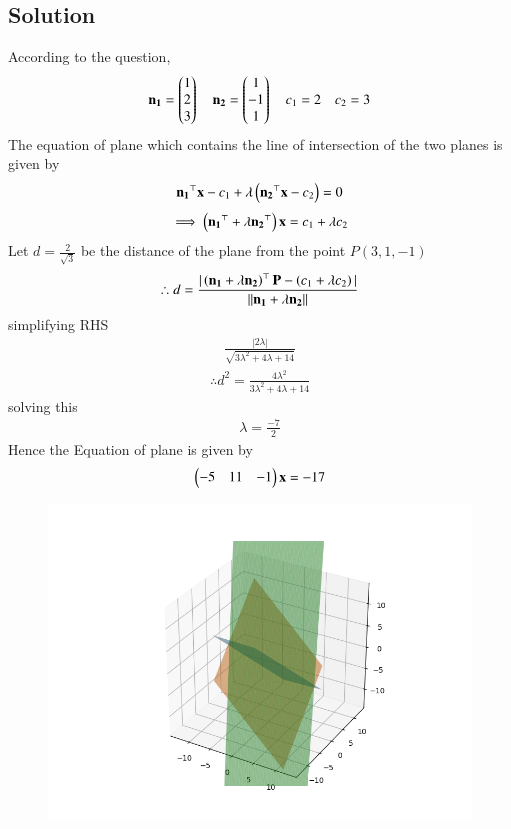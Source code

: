\documentclass[journal]{IEEEtran}
\begin{document}
\subsection*{\textbf{Solution}}
According to the question,\\
\begin{align}
    \mathbf{n_1}=\begin{pmatrix}1\\2\\3\end{pmatrix} \quad \mathbf{n_2}=\begin{pmatrix}1\\-1\\1\end{pmatrix} \quad c_1=2 \quad c_2=3
\end{align}
The equation of plane which contains the line of intersection of the two planes is given by
\begin{align}
    \mathbf{n_1}^{\top}\mathbf{x}-c_1+\lambda\left(\mathbf{n_2}^{\top}\mathbf{x}-c_2\right)=0
\end{align}
\begin{align}
    \implies \left(\mathbf{n_1}^{\top}+\lambda\mathbf{n_2}^{\top}\right)\mathbf{x}=c_1+\lambda c_2
\end{align}
Let $d = \frac{2}{\sqrt{3}}$ be the distance of the plane from the point $P(3,1,-1)$ 
\begin{align}
    \therefore d = \frac{|\left(\mathbf{n_1}+\lambda\mathbf{n_2}\right)^{\top}\mathbf{P} - \left(c_1+\lambda c_2\right)|}{||\mathbf{n_1}+\lambda \mathbf{n_2}||}
\end{align}
simplifying RHS
\begin{align}
    \frac{|2\lambda|}{\sqrt{3\lambda ^2 +4\lambda +14}}
\end{align}
\begin{align}
    \therefore d^2= \frac{4\lambda ^2}{3\lambda ^2 +4\lambda +14}
\end{align}
solving this
\begin{align}
   \lambda =\frac{-7}{2}
\end{align}
Hence the Equation of plane is given by
\begin{align}
    \begin{pmatrix}-5&11&-1\end{pmatrix}\mathbf{x}=-17
\end{align}
\newpage
\begin{figure}[H]
    \centering
    \includegraphics[width=0.8\columnwidth]{figs/fig.png}
    \label{fig:1}
\end{figure}
\end{document}
